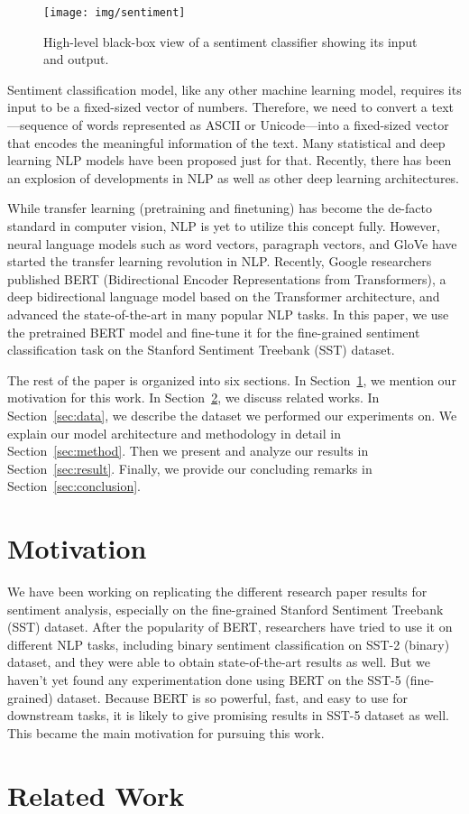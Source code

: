 \documentclass[conference]{IEEEtran}
\begin{document}
\begin{figure}[ht]
    \centering
    \texttt{[image: img/sentiment]}
    \caption{High-level black-box view of a sentiment classifier showing its input and output.}
    \label{fig:sentiment}
\end{figure}

Sentiment classification model, like any other machine learning model, requires its input to be a fixed-sized vector of numbers. Therefore, we need to convert a text---sequence of words represented as ASCII or Unicode---into a fixed-sized vector that encodes the meaningful information of the text. Many statistical and deep learning NLP models have been proposed just for that. Recently, there has been an explosion of developments in NLP as well as other deep learning architectures.

While transfer learning (pretraining and finetuning) has become the de-facto standard in computer vision, NLP is yet to utilize this concept fully. However, neural language models such as word vectors\cite{wordvec}, paragraph vectors\cite{doc2vec}, and GloVe\cite{glove} have started the transfer learning revolution in NLP. Recently, Google researchers published BERT (Bidirectional Encoder Representations from Transformers)\cite{bert}, a deep bidirectional language model based on the Transformer architecture\cite{attention}, and advanced the state-of-the-art in many popular NLP tasks. In this paper, we use the pretrained BERT model and fine-tune it for the fine-grained sentiment classification task on the Stanford Sentiment Treebank (SST) dataset.

The rest of the paper is organized into six sections. In Section~\ref{sec:motivation}, we mention our motivation for this work. In Section~\ref{sec:related}, we discuss related works. In Section~\ref{sec:data}, we describe the dataset we performed our experiments on. We explain our model architecture and methodology in detail in Section~\ref{sec:method}. Then we present and analyze our results in Section~\ref{sec:result}. Finally, we provide our concluding remarks in Section~\ref{sec:conclusion}. \section{Motivation}\label{sec:motivation}

We have been working on replicating the different research paper results for sentiment analysis, especially on the fine-grained Stanford Sentiment Treebank (SST) dataset. After the popularity of BERT, researchers have tried to use it on different NLP tasks, including binary sentiment classification on SST-2 (binary) dataset, and they were able to obtain state-of-the-art results as well. But we haven't yet found any experimentation done using BERT on the SST-5 (fine-grained) dataset. Because BERT is so powerful, fast, and easy to use for downstream tasks, it is likely to give promising results in SST-5 dataset as well. This became the main motivation for pursuing this work. \section{Related Work}\label{sec:related}
\end{document}
